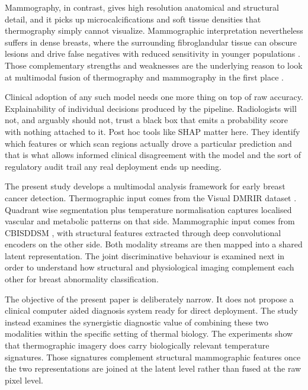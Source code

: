 \documentclass[lettersize,journal]{IEEEtran}
\begin{document}
Mammography, in contrast, gives high resolution anatomical and structural detail, and it picks up microcalcifications and soft tissue densities that thermography simply cannot visualize. Mammographic interpretation nevertheless suffers in dense breasts, where the surrounding fibroglandular tissue can obscure lesions and drive false negatives with reduced sensitivity in younger populations \cite{boyd2007mammographic, destounis2021supplemental}. Those complementary strengths and weaknesses are the underlying reason to look at multimodal fusion of thermography and mammography in the first place \cite{mostafa2022multi, khan2023hybrid}.

Clinical adoption of any such model needs one more thing on top of raw accuracy. Explainability of individual decisions produced by the pipeline. Radiologists will not, and arguably should not, trust a black box that emits a probability score with nothing attached to it. Post hoc tools like SHAP matter here. They identify which features or which scan regions actually drove a particular prediction and that is what allows informed clinical disagreement with the model and the sort of regulatory audit trail any real deployment ends up needing.

The present study develops a multimodal analysis framework for early breast cancer detection. Thermographic input comes from the Visual DMR\textendash IR dataset \cite{Moreira2014VisualDMR, Silva2018DMRIR}. Quadrant wise segmentation plus temperature normalisation captures localised vascular and metabolic patterns on that side. Mammographic input comes from CBIS\textendash DDSM \cite{Lee2017CBISDDSM}, with structural features extracted through deep convolutional encoders on the other side. Both modality streams are then mapped into a shared latent representation. The joint discriminative behaviour is examined next in order to understand how structural and physiological imaging complement each other for breast abnormality classification.

The objective of the present paper is deliberately narrow. It does not propose a clinical computer aided diagnosis system ready for direct deployment. The study instead examines the synergistic diagnostic value of combining these two modalities within the specific setting of thermal biology. The experiments show that thermographic imagery does carry biologically relevant temperature signatures. Those signatures complement structural mammographic features once the two representations are joined at the latent level rather than fused at the raw pixel level.
\end{document}
